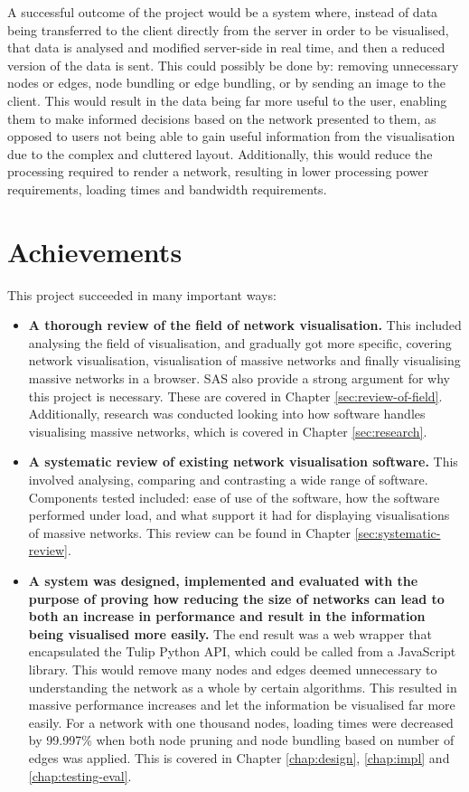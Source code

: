 \documentclass[../dissertation.tex]{subfiles}
\begin{document}
A successful outcome of the project would be a system where, instead of data being transferred to the client directly from the server in order to be visualised, that data is analysed and modified server-side in real time, and then a reduced version of the data is sent. This could possibly be done by: removing unnecessary nodes or edges, node bundling or edge bundling, or by sending an image to the client. This would result in the data being far more useful to the user, enabling them to make informed decisions based on the network presented to them, as opposed to users not being able to gain useful information from the visualisation due to the complex and cluttered layout. Additionally, this would reduce the processing required to render a network, resulting in lower processing power requirements, loading times and bandwidth requirements.

\section{Achievements}

This project succeeded in many important ways:

\begin{itemize}
    \item \textbf{A thorough review of the field of network visualisation.} This included analysing the field of visualisation, and gradually got more specific, covering network visualisation, visualisation of massive networks and finally visualising massive networks in a browser. SAS also provide a strong argument for why this project is necessary. These are covered in Chapter \ref{sec:review-of-field}. Additionally, research was conducted looking into how software handles visualising massive networks, which is covered in Chapter \ref{sec:research}.
    \item \textbf{A systematic review of existing network visualisation software.} This involved analysing, comparing and contrasting a wide range of software. Components tested included: ease of use of the software, how the software performed under load, and what support it had for displaying visualisations of massive networks. This review can be found in Chapter \ref{sec:systematic-review}.
    \item \textbf{A system was designed, implemented and evaluated with the purpose of proving how reducing the size of networks can lead to both an increase in performance and result in the information being visualised more easily.} The end result was a web wrapper that encapsulated the Tulip Python API, which could be called from a JavaScript library. This would remove many nodes and edges deemed unnecessary to understanding the network as a whole by certain algorithms. This resulted in massive performance increases and let the information be visualised far more easily. For a network with one thousand nodes, loading times were decreased by 99.997\% when both node pruning and node bundling based on number of edges was applied. This is covered in Chapter \ref{chap:design}, \ref{chap:impl} and \ref{chap:testing-eval}.
\end{itemize}
\end{document}
